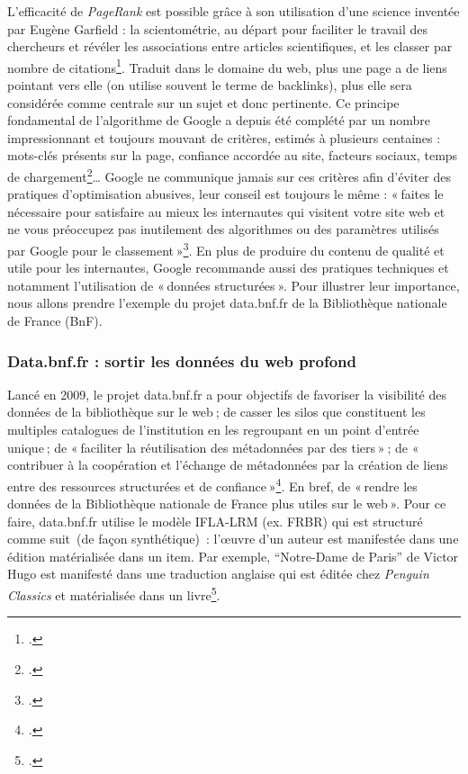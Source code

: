 L'efficacité de \textit{PageRank} est possible grâce à son utilisation d’une science inventée par Eugène Garfield : la scientométrie, au départ pour faciliter le travail des chercheurs et révéler les associations entre articles scientifiques, et les classer par nombre de citations\footcite[§ 5]{cardon2013}. Traduit dans le domaine du web, plus une page a de liens pointant vers elle (on utilise souvent le terme de backlinks), plus elle sera considérée comme centrale sur un sujet et donc pertinente. Ce principe fondamental de l’algorithme de Google a depuis été complété par un nombre impressionnant et toujours mouvant de critères, estimés à plusieurs centaines : mots-clés présents sur la page, confiance accordée au site, facteurs sociaux, temps de chargement\footcite{ertzscheid2019}… Google ne communique jamais sur ces critères afin d’éviter des pratiques d’optimisation abusives, leur conseil est toujours le même : « faites le nécessaire pour satisfaire au mieux les internautes qui visitent votre site web et ne vous préoccupez pas inutilement des algorithmes ou des paramètres utilisés par Google pour le classement »\footcite{zotero-236}. En plus de produire du contenu de qualité et utile pour les internautes, Google recommande aussi des pratiques techniques et notamment l’utilisation de « données structurées ». Pour illustrer leur importance, nous allons prendre l’exemple du projet data.bnf.fr de la Bibliothèque nationale de France (BnF).

\subsubsection{Data.bnf.fr : sortir les données du web profond}

Lancé en 2009, le projet data.bnf.fr a pour objectifs de favoriser la visibilité des données de la bibliothèque sur le web ; de casser les silos que constituent les multiples catalogues de l’institution en les regroupant en un point d’entrée unique ; de « faciliter la réutilisation des métadonnées par des tiers » ; de « contribuer à la coopération et l’échange de métadonnées par la création de liens entre des ressources structurées et de confiance »\footcite{s.d.}. En bref, de « rendre les données de la Bibliothèque nationale de France plus utiles sur le web ». Pour ce faire, data.bnf.fr utilise le modèle IFLA-LRM (ex. FRBR) qui est structuré comme suit (de façon synthétique) : l’œuvre d’un auteur est manifestée dans une édition matérialisée dans un item. Par exemple, \enquote{Notre-Dame de Paris} de Victor Hugo est manifesté dans une traduction anglaise qui est éditée chez \textit{Penguin Classics} et matérialisée dans un livre\footcite{bermes2023}.


